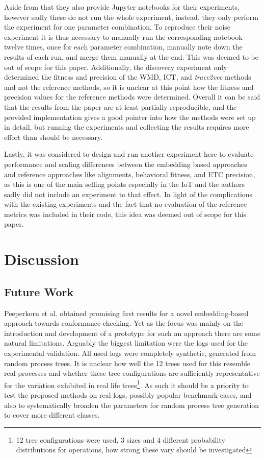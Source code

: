 \documentclass[runningheads]{template/llncs}
\begin{document}
Aside from that they also provide Jupyter notebooks for their experiments, however sadly these do not run the whole experiment, instead, they only perform the experiment for one parameter combination.
To reproduce their noise experiment it is thus necessary to manually run the corresponding notebook twelve times, once for each parameter combination, manually note down the results of each run, and merge them manually at the end.
This was deemed to be out of scope for this paper.
Additionally, the discovery experiment only determined the fitness and precision of the WMD, ICT, and \emph{trace2vec} methods and not the reference methods, so it is unclear at this point how the fitness and precision values for the reference methods were determined.
Overall it can be said that the results from the paper are at least partially reproducible, and the provided implementation gives a good pointer into how the methods were set up in detail, but running the experiments and collecting the results requires more effort than should be necessary.

Lastly, it was considered to design and run another experiment here to evaluate performance and scaling differences between the embedding based approaches and reference approaches like alignments, behavioral fitness, and ETC precision, as this is one of the main selling points especially in the IoT and the authors sadly did not include an experiment to that effect.
In light of the complications with the existing experiments and the fact that no evaluation of the reference metrics was included in their code, this idea was deemed out of scope for this paper.

\section{Discussion}
\label{sec:discussion}
\subsection{Future Work}
Peeperkorn et al. obtained promising first results for a novel embedding-based approach towards conformance checking.
Yet as the focus was mainly on the introduction and development of a prototype for such an approach there are some natural limitations.
Arguably the biggest limitation were the logs used for the experimental validation.
All used logs were completely synthetic, generated from random process trees.
It is unclear how well the 12 trees used for this resemble real processes and whether these tree configurations are sufficiently representative for the variation exhibited in real life trees\footnote{12 tree configurations were used, 3 sizes and 4 different probability distributions for operations, how strong these vary should be investigated}.
As such it should be a priority to test the proposed methods on real logs, possibly popular benchmark cases, and also to systematically broaden the parameters for random process tree generation to cover more different classes.
\end{document}
